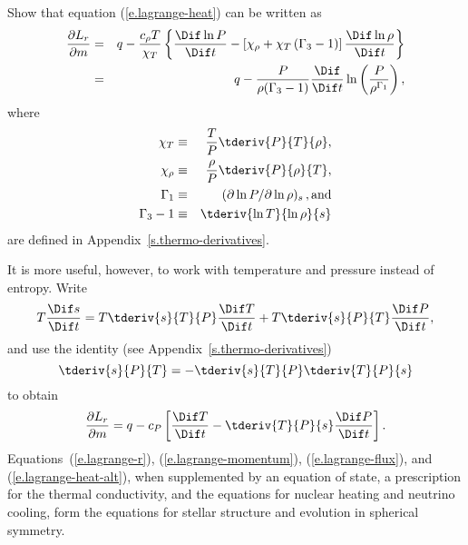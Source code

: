 \begin{exercisebox}
 \label{p.lagrange-heat} Show that equation (\ref{e.lagrange-heat}) can be written as
\begin{eqnarray}
\frac{\partial L_{r}}{\partial m} &=& q - \frac{c_{\rho} T}{\chi_{T}}\left\{\frac{\Dif\ln P}{\Dif t} - \left[\chi_{\rho} + \chi_{T}\left(\Gamma_{3} - 1\right)\right]\frac{\Dif\ln \rho}{\Dif t}\right\}\\
 &=& q - \frac{P}{\rho(\Gamma_{3}-1)}\frac{\Dif }{\Dif t}\ln\left(\frac{P}{\rho^{\Gamma_{1}}}\right),
\label{e.lagrange-heat-alt2}
\end{eqnarray}
where
\begin{eqnarray*}
 \chi_{T} &\equiv& \frac{T}{P}\tderiv{P}{T}{\rho},\\
 \chi_{\rho} &\equiv& \frac{\rho}{P}\tderiv{P}{\rho}{T},\\
 \Gamma_{1} &\equiv& (\partial \ln P/\partial\ln \rho)_{s}\,,\textrm{and}\\
 \Gamma_{3}-1 &\equiv& \tderiv{\ln T}{\ln \rho}{s}
\end{eqnarray*}
are defined in Appendix~\ref{s.thermo-derivatives}.
\end{exercisebox}


It is more useful, however, to work with temperature and pressure instead of entropy.  Write
\[
	T\frac{\Dif s}{\Dif t} = T\tderiv{s}{T}{P}\frac{\Dif T}{\Dif t} + T\tderiv{s}{P}{T}\frac{\Dif P}{\Dif t},
\]
and use the identity (see Appendix~\ref{s.thermo-derivatives})
\[
	\tderiv{s}{P}{T} = -\tderiv{s}{T}{P}\tderiv{T}{P}{s}
\]
to obtain
\begin{equation}\label{e.lagrange-heat-alt}
	\frac{\partial L_{r}}{\partial m}
	= q - c_{P}\left[ \frac{\Dif T}{\Dif t} - \tderiv{T}{P}{s} \frac{\Dif P}{\Dif t}\right].
\end{equation}
Equations~(\ref{e.lagrange-r}), (\ref{e.lagrange-momentum}), (\ref{e.lagrange-flux}), and (\ref{e.lagrange-heat-alt}), when supplemented by an equation of state, a prescription for the thermal conductivity, and the equations for nuclear heating and neutrino cooling, form the equations for stellar structure and evolution in spherical symmetry.
